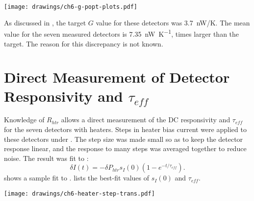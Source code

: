 \begin{figure*}
\texttt{[image: drawings/ch6-g-popt-plots.pdf]}
\caption[Impact of different $P_{opt}$ assumptions]{
Plots showing effect of $P_{opt}$ assumptions on $G$ and $T_c$ measurements.
\textbf{Left} Plot showing variation of $G$ for  vs assumed value of $P_{opt}$.
The statistical uncertainty in $G$ for this detector is approximately the same as the systematic uncertainty that results from the estimation of $P_{opt}$.
\textbf{Right} Plot showing variation of $T_c$ for  vs assumed value of $P_{opt}$.
In this case the systematic uncertainty is larger than the statistical uncertainty, although the change is only \SI{2.2}{\percent} as $P_{opt}$ increases from \SI{100}{\pW} to \SI{300}{\pW}.
The value of $n$ shows no trend with $P_{opt}$.
} 
\label{fig:heater-g-popt-plots}
\end{figure*}

As discussed in , the target $G$ value for these detectors was 3.7~nW/K.
The mean value for the seven measured detectors is \SI{7.35}{\nano\watt\per\kelvin},  times larger than the target.
The reason for this discrepancy is not known.

\section{Direct Measurement of Detector Responsivity and $\tau_{eff}$} \label{sec:teff-resp}

%
%

Knowledge of $R_{htr}$ allows a direct measurement of the DC responsivity and $\tau_{eff}$ for the seven detectors with heaters.
Steps in heater bias current were applied to these detectors under \SOC.
The step size was made small so as to keep the detector response linear, and the response to many steps was averaged together to reduce noise.
The result was fit to :
\begin{equation} \label{eqn:ch6-heater-step-trans}
  \delta I(t) = - \delta P_{htr} s_I(0) (1 - e^{-t/\tau_{eff}}).
\end{equation}
 shows a sample fit to .
 lists the best-fit values of $s_I(0)$ and $\tau_{eff}$.

\begin{figure*}
\centering
\texttt{[image: drawings/ch6-heater-step-trans.pdf]}
\caption[Detector response to heater steps]{
Plot showing response of detector  to step in applied heater power of \SI{1.41}{\pico\watt}.
Plots are for  biased into \SOC.
Data acquired at \SI{3125}{\Hz}.
The data averaged over 32 steps (16 up and 16 down), along with best fit to , are plotted.
The step in applied power begins at $t \approx \SI{0.6}{\ms}$, not $t = \SI{0}{\ms}$.
} 
\label{fig:ch6-heater-step-trans}
\end{figure*}

